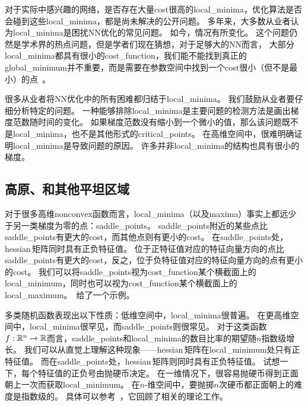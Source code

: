 对于实际中感兴趣的网络，是否存在大量\gls{cost}很高的\gls{local_minima}，优化算法是否会碰到这些\gls{local_minima}，都是尚未解决的公开问题。
多年来，大多数从业者认为\gls{local_minima}是困扰\gls{NN}优化的常见问题。
如今，情况有所变化。
这个问题仍然是学术界的热点问题，但是学者们现在猜想，对于足够大的\gls{NN}而言，
大部分\gls{local_minima}都具有很小的\gls{cost_function}，我们能不能找到真正的\gls{global_minimum}并不重要，而是需要在参数空间中找到一个\gls{cost}很小（但不是最小）的点~\citep{Saxe-et-al-ICLR13,Dauphin-et-al-NIPS2014-small,GoodfellowOptimization15,Choromanska-et-al-AISTATS2015}。

很多从业者将\gls{NN}优化中的所有困难都归结于\gls{local_minima}。
我们鼓励从业者要仔细分析特定的问题。
一种能够排除\gls{local_minima}是主要问题的检测方法是画出梯度范数随时间的变化。
如果梯度范数没有缩小到一个微小的值，那么该问题既不是\gls{local_minima}，也不是其他形式的\gls{critical_points}。
在高维空间中，很难明确证明\gls{local_minima}是导致问题的原因。
许多并非\gls{local_minima}的结构也具有很小的梯度。

\subsection{高原、和其他平坦区域}
\label{sec:plateaus_saddle_points_and_other_flat_regions}
对于很多高维\gls{nonconvex}函数而言，\gls{local_minima}（以及\gls{maxima}）事实上都远少于另一类梯度为零的点：\gls{saddle_points}。
\gls{saddle_points}附近的某些点比\gls{saddle_points}有更大的\gls{cost}，而其他点则有更小的\gls{cost}。
在\gls{saddle_points}处，\gls{hessian}\,矩阵同时具有正负特征值。
位于正特征值对应的特征向量方向的点比\gls{saddle_points}有更大的\gls{cost}，反之，位于负特征值对应的特征向量方向的点有更小的\gls{cost}。
我们可以将\gls{saddle_points}视为\gls{cost_function}某个横截面上的\gls{local_minimum}，同时也可以视为\gls{cost_function}某个横截面上的\gls{local_maximum}。
\,给了一个示例。


多类随机函数表现出以下性质：低维空间中，\gls{local_minima}很普遍。
在更高维空间中，\gls{local_minima}很罕见，而\gls{saddle_points}则很常见。
对于这类函数$f:\mathbb{R}^n \to \mathbb{R}$而言，\gls{saddle_points}和\gls{local_minima}的数目比率的期望随$n$指数级增长。
我们可以从直觉上理解这种现象——\gls{hessian}\,矩阵在\gls{local_minimum}处只有正特征值。
而在\gls{saddle_points}处，\gls{hessian}\,矩阵则同时具有正负特征值。
试想一下，每个特征值的正负号由抛硬币决定。
在一维情况下，很容易抛硬币得到正面朝上一次而获取\gls{local_minimum}。
在$n$-维空间中，要抛掷$n$次硬币都正面朝上的难度是指数级的。 
具体可以参考~\cite{Dauphin-et-al-NIPS2014-small}，它回顾了相关的理论工作。



